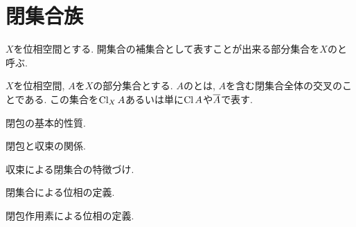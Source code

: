 \documentclass[uplatex, dvipdfmx, a4paper, 12pt, class=jsbook, crop=false]{standalone}
\begin{document}
\section{閉集合族}
\label{sec:closed-sets}

\begin{definition}
	$ X $を位相空間とする.
	開集合の補集合として表すことが出来る部分集合を$ X $のと呼ぶ.
\end{definition}

\begin{definition}
	$ X $を位相空間, $ A $を$ X $の部分集合とする.
	$ A $のとは, $ A $を含む閉集合全体の交叉のことである.
	この集合を$ \mathop{\mathrm{Cl}}\nolimits_X A $あるいは単に$ \mathop{\mathrm{Cl}}\nolimits A $や$ \overline{A} $で表す.
\end{definition}

\begin{proposition}
	閉包の基本的性質.
\end{proposition}

\begin{proposition}
	閉包と収束の関係.
\end{proposition}

\begin{corollary}
	収束による閉集合の特徴づけ.
\end{corollary}

\begin{proposition}
	閉集合による位相の定義.
\end{proposition}

\begin{proposition}
	閉包作用素による位相の定義.
\end{proposition}
\end{document}
